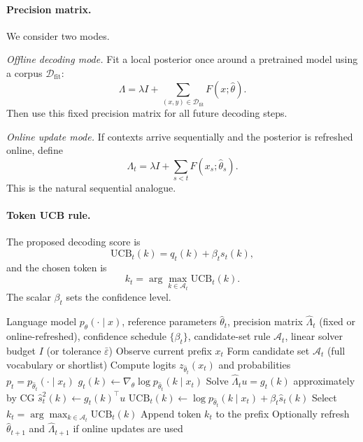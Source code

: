 \documentclass[11pt]{article}
\begin{document}
\paragraph{Precision matrix.}
We consider two modes.

\emph{Offline decoding mode.}
Fit a local posterior once around a pretrained model using a corpus
$\mathcal{D}_{\mathrm{fit}}$:
\[
\Lambda
=
\lambda I
+
\sum_{(x,y)\in \mathcal{D}_{\mathrm{fit}}}
F(x;\hat\theta).
\]
Then use this fixed precision matrix for all future decoding steps.

\emph{Online update mode.}
If contexts arrive sequentially and the posterior is refreshed online,
define
\[
\Lambda_t
=
\lambda I + \sum_{s<t} F(x_s;\hat\theta_s).
\]
This is the natural sequential analogue.

\paragraph{Token UCB rule.}
The proposed decoding score is
\[
\mathrm{UCB}_t(k)
=
q_t(k) + \beta_t s_t(k),
\]
and the chosen token is
\[
k_t
=
\arg\max_{k\in\mathcal{A}_t}
\mathrm{UCB}_t(k).
\]
The scalar $\beta_t$ sets the confidence level.

\begin{algorithm}[h]
\caption{Fisher-Calibrated Token UCB (FT-UCB)}\label{alg:ftucb}
\begin{algorithmic}[1]
\REQUIRE Language model $p_\theta(\cdot\mid x)$, reference parameters $\hat\theta_t$,
         precision matrix $\hat\Lambda_t$ (fixed or online-refreshed),
         confidence schedule $\{\beta_t\}$,
         candidate-set rule $\mathcal{A}_t$,
         linear solver budget $I$ (or tolerance $\bar\varepsilon$)
  \STATE Observe current prefix $x_t$
  \STATE Form candidate set $\mathcal{A}_t$ (full vocabulary or shortlist)
  \STATE Compute logits $z_{\hat\theta_t}(x_t)$ and probabilities
         $p_t = p_{\hat\theta_t}(\cdot\mid x_t)$
    \STATE $g_t(k)\gets \nabla_\theta \log p_{\hat\theta_t}(k\mid x_t)$
    \STATE Solve $\hat\Lambda_t u = g_t(k)$ approximately by CG
    \STATE $\hat s_t^2(k)\gets g_t(k)^\top u$
    \STATE $\mathrm{UCB}_t(k)\gets \log p_{\hat\theta_t}(k\mid x_t)+\beta_t \hat s_t(k)$
  \ENDFOR
  \STATE Select $k_t = \arg\max_{k\in\mathcal{A}_t}\mathrm{UCB}_t(k)$
  \STATE Append token $k_t$ to the prefix
  \STATE Optionally refresh $\hat\theta_{t+1}$ and $\hat\Lambda_{t+1}$ if online updates are used
\ENDFOR
\end{algorithmic}
\end{algorithm}
\end{document}
